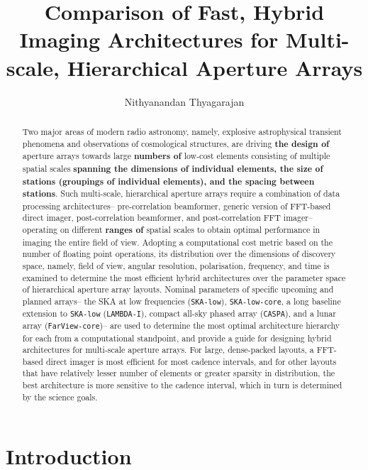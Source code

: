 \documentclass[
  journal=pasa,
  manuscript=article-type,
  year=2020,
  volume=37,
]{cup-journal}
\title{Comparison of Fast, Hybrid Imaging Architectures for Multi-scale, Hierarchical Aperture Arrays}
\author{Nithyanandan Thyagarajan}
\affiliation{CSIRO, Space \& Astronomy, P. O. Box 1130, Bentley, WA 6102, Australia}
\begin{document}
\begin{abstract}
Two major areas of modern radio astronomy, namely, explosive astrophysical transient phenomena and observations of cosmological structures, are driving \textbf{the design of} aperture arrays towards large \textbf{numbers of} low-cost elements consisting of multiple spatial scales \textbf{spanning the dimensions of individual elements, the size of stations (groupings of individual elements), and the spacing between stations}. Such multi-scale, hierarchical aperture arrays require a combination of data processing architectures-- pre-correlation beamformer, generic version of FFT-based direct imager, post-correlation beamformer, and post-correlation FFT imager-- operating on different \textbf{ranges of} spatial scales to obtain optimal performance in imaging the entire field of view. Adopting a computational cost metric based on the number of floating point operations, its distribution over the dimensions of discovery space, namely, field of view, angular resolution, polarisation, frequency, and time is examined to determine the most efficient hybrid architectures over the parameter space of hierarchical aperture array layouts. Nominal parameters of specific upcoming and planned arrays-- the SKA at low frequencies (\texttt{SKA-low}), \texttt{SKA-low-core}, a long baseline extension to \texttt{SKA-low} (\texttt{LAMBDA-I}), compact all-sky phased array (\texttt{CASPA}), and a lunar array (\texttt{FarView-core})-- are used to determine the most optimal architecture hierarchy for each from a computational standpoint, and provide a guide for designing hybrid architectures for multi-scale aperture arrays. For large, dense-packed layouts, a FFT-based direct imager is most efficient for most cadence intervals, and for other layouts that have relatively lesser number of elements or greater sparsity in distribution, the best architecture is more sensitive to the cadence interval, which in turn is determined by the science goals.
\end{abstract}

\section{Introduction}
\end{document}
